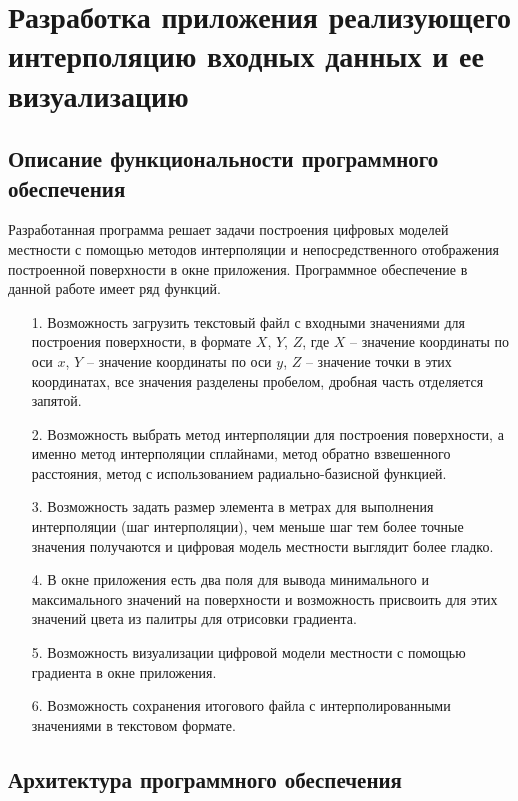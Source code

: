 \chapter{Разработка приложения реализующего интерполяцию входных данных и ее визуализацию}

\section{Описание функциональности программного обеспечения}

Разработанная программа решает задачи построения цифровых моделей местности с помощью методов интерполяции и непосредственного отображения построенной поверхности в окне приложения. Программное обеспечение в данной работе имеет ряд функций. 

\begin{enumerate} 
  \item[1.] Возможность загрузить текстовый файл с входными значениями для построения поверхности, в формате $X$, $Y$, $Z$, где $X$ -- значение координаты по оси $x$, $Y$ -- значение координаты по оси $y$, $Z$ -- значение точки в этих координатах, все значения разделены пробелом, дробная часть отделяется запятой.
  \item[2.] Возможность выбрать метод интерполяции для построения поверхности, а именно метод интерполяции сплайнами, метод обратно взвешенного расстояния, метод с использованием радиально-базисной функцией.
  \item[3.] Возможность задать размер элемента в метрах для выполнения интерполяции (шаг интерполяции), чем меньше шаг тем более точные значения получаются и цифровая модель местности выглядит более гладко.
  \item[4.] В окне приложения есть два поля для вывода минимального и максимального значений на поверхности и возможность присвоить для этих значений цвета из палитры для отрисовки градиента.
  \item[5.] Возможность визуализации цифровой модели местности с помощью градиента в окне приложения.
  \item[6.] Возможность сохранения итогового файла с интерполированными значениями в текстовом формате.
  
\end{enumerate} 

\section{Архитектура программного обеспечения}

